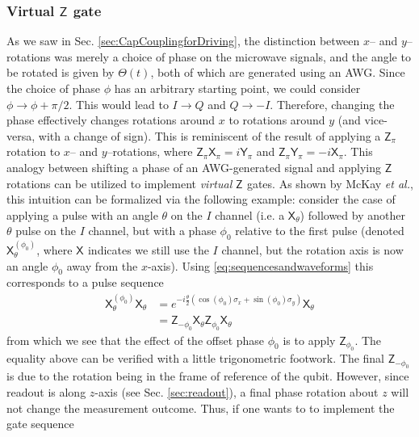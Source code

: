 \documentclass[aip,apr,twocolumn,showpacs,superscriptaddress,groupedaddress,nofootinbib,reprint]{revtex4-1}  %
\newcommand{\X}[1]{\textsf{X}_{#1}}
\newcommand{\Y}[1]{\textsf{Y}_{#1}}
\newcommand{\Z}[1]{\textsf{Z}_{#1}}
\begin{document}
\subsubsection{\label{sec:EfficientZgateOperation}Virtual $\Z{}$ gate}
As we saw in Sec. \ref{sec:CapCouplingforDriving}, the distinction between $x$-- and $y$--rotations was merely a choice of phase on the microwave signals, and the angle to be rotated is given by $\Theta(t)$, both of which are generated using an AWG. Since the choice of phase $\phi$ has an arbitrary starting point, we could consider $\phi \rightarrow \phi+\pi/2$. This would lead to $I \rightarrow Q$ and $Q \rightarrow -I$. Therefore, changing the phase effectively changes rotations around $x$ to rotations around $y$ (and vice-versa, with a change of sign). This is reminiscent of the result of applying a $\Z{\pi}$ rotation to $x$-- and $y$--rotations, where $\Z{\pi} \X{\pi} = i\Y{\pi}$ and $\Z{\pi} \Y{\pi} = - i\X{\pi}$. This analogy between shifting a phase of an AWG-generated signal and applying $\Z{}$ rotations can be utilized to implement \emph{virtual} $\Z{}$ gates\cite{McKay2017}. As shown by McKay \emph{et al.}, this intuition can be formalized via the following example: consider the case of applying a pulse with an angle $\theta$ on the $I$ channel (i.e. a $\X{\theta}$) followed by another $\theta$ pulse on the $I$ channel, but with a phase $\phi_0$ relative to the first pulse (denoted $\X{\theta}^{(\phi_0)}$, where $\X{}$ indicates we still use the $I$ channel, but the rotation axis is now an angle $\phi_0$ away from the $x$-axis). Using \cref{eq:sequencesandwaveforms} this corresponds to a pulse sequence
\begin{align}
\X{\theta}^{(\phi_0)}\X{\theta} &= e^{-i\frac{\theta}{2}\left(\cos(\phi_0)\sigma_x + \sin(\phi_0) \sigma_y\right)}\X{\theta}\\
& = \Z{-\phi_0}\X{\theta}\Z{\phi_0}\X{\theta}
\end{align}
from which we see that the effect of the offset phase $\phi_0$ is to apply $\Z{\phi_0}$. The equality above can be verified with a little trigonometric footwork. The final $\Z{-\phi_0}$ is due to the rotation being in the frame of reference of the qubit. However, since readout is along $z$-axis (see Sec. \ref{sec:readout}), a final phase rotation about $z$ will not change the measurement outcome. Thus, if one wants to to implement the gate sequence
\end{document}
